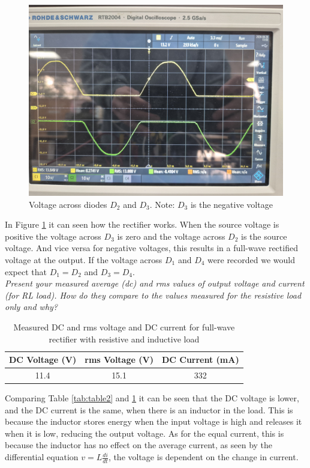 \documentclass[12pt,a4paper]{article}
\begin{document}
\begin{figure}[H]
\centering
\includegraphics[width=.7\columnwidth]{Images/20250828_131136.jpg}
\caption{Voltage across diodes \(D_2\) and \(D_3\). Note: \(D_3\) is the negative voltage \label{fig:figure4}}
\end{figure}

In Figure \ref{fig:figure4} it can seen how the rectifier works. When the source voltage is positive the voltage across \(D_3\) is zero and the voltage across \(D_2\) is the source voltage. And vice versa for negative voltages, this results in a full-wave rectified voltage at the output. If the voltage across \(D_1\) and \(D_4\) were recorded we would expect that \(D_1 = D_2\) and \(D_3 = D_4\).\\

\textit{Present your measured average (dc) and rms values of output voltage and current (for RL load).
How do they compare to the values measured for the resistive load only and why?}\\

\begin{table}[H]
\caption{Measured DC and rms voltage and DC current for full-wave rectifier with resistive and inductive load \label{tab:table3}}
\centering
\begin{tabular}{|c|c|c|}
\hline
DC Voltage (V) & rms Voltage (V) & DC Current (mA)\\
\hline
11.4 & 15.1 & 332\\
\hline
\end{tabular}
\end{table}

Comparing Table \ref{tab:table2} and \ref{tab:table3} it can be seen that the DC voltage is lower, and the DC current is the same, when there is an inductor in the load. This is because the inductor stores energy when the input voltage is high and releases it when it is low, reducing the output voltage. As for the equal current, this is because the inductor has no effect on the average current, as seen by the differential equation $v = L \frac{di}{dt}$, the voltage is dependent on the change in current.\\
\end{document}
